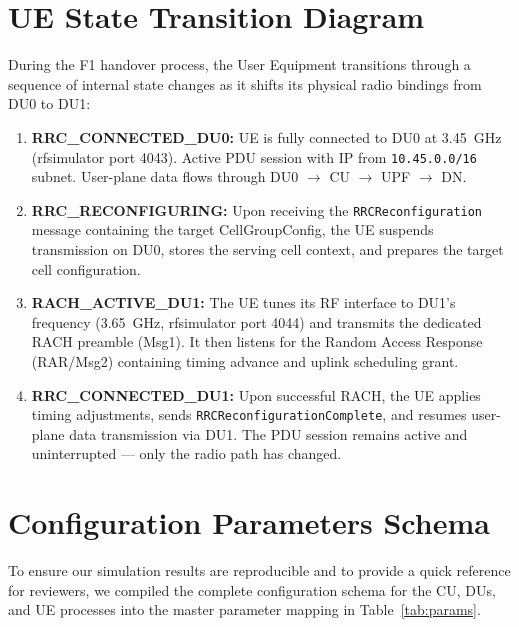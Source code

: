 \section{UE State Transition Diagram}
\justify
During the F1 handover process, the User Equipment transitions through a sequence of internal state changes as it shifts its physical radio bindings from DU0 to DU1:

\begin{enumerate}[leftmargin=*]
    \item \textbf{RRC\_CONNECTED\_DU0:} UE is fully connected to DU0 at 3.45~GHz (rfsimulator port 4043). Active PDU session with IP from \texttt{10.45.0.0/16} subnet. User-plane data flows through DU0 $\rightarrow$ CU $\rightarrow$ UPF $\rightarrow$ DN.
    
    \item \textbf{RRC\_RECONFIGURING:} Upon receiving the \texttt{RRCReconfiguration} message containing the target CellGroupConfig, the UE suspends transmission on DU0, stores the serving cell context, and prepares the target cell configuration.
    
    \item \textbf{RACH\_ACTIVE\_DU1:} The UE tunes its RF interface to DU1's frequency (3.65~GHz, rfsimulator port 4044) and transmits the dedicated RACH preamble (Msg1). It then listens for the Random Access Response (RAR/Msg2) containing timing advance and uplink scheduling grant.
    
    \item \textbf{RRC\_CONNECTED\_DU1:} Upon successful RACH, the UE applies timing adjustments, sends \texttt{RRCReconfigurationComplete}, and resumes user-plane data transmission via DU1. The PDU session remains active and uninterrupted --- only the radio path has changed.
\end{enumerate}


\section{Configuration Parameters Schema}
\justify
To ensure our simulation results are reproducible and to provide a quick reference for reviewers, we compiled the complete configuration schema for the CU, DUs, and UE processes into the master parameter mapping in Table~\ref{tab:params}.

